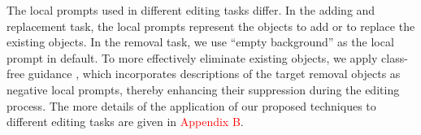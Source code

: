 \documentclass{article}
\begin{document}
The local prompts used in different editing tasks differ. In the adding and replacement task, the local prompts represent the objects to add or to replace the existing objects. In the removal task, we use ``empty background'' as the local prompt in default. To more effectively eliminate existing objects, we apply class-free guidance \citep{ho2022classifier}, which incorporates descriptions of the target removal objects as negative local prompts, thereby enhancing their suppression during the editing process.
The more details of the application of our proposed techniques to different editing tasks are given in \textcolor{red}{Appendix B}.









\end{document}
